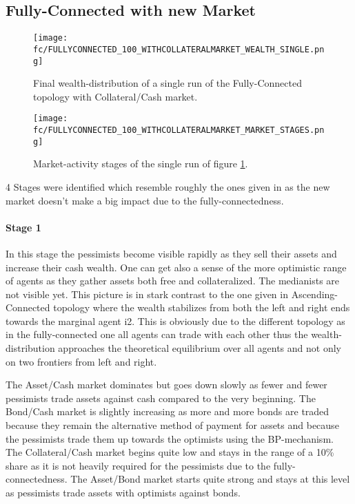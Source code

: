 \documentclass[Bachelorarbeit.tex]{subfiles}
\begin{document}
\subsection{Fully-Connected with new Market}

\begin{figure}[H]
	\centering
  \texttt{[image: fc/FULLYCONNECTED\_100\_WITHCOLLATERALMARKET\_WEALTH\_SINGLE.png]}
  	\caption{Final wealth-distribution of a single run of the Fully-Connected topology with Collateral/Cash market.}
	\label{fig:wealth_FULLYCONNECTED_100_WITHCOLLATERALMARKET_WEALTH_SINGLE}
\end{figure}

\begin{figure}[H]
	\centering
  \texttt{[image: fc/FULLYCONNECTED\_100\_WITHCOLLATERALMARKET\_MARKET\_STAGES.png]}
  	\caption{Market-activity stages of the single run of figure \ref{fig:wealth_FULLYCONNECTED_100_WITHCOLLATERALMARKET_WEALTH_SINGLE}.}
	\label{fig:markets_FULLYCONNECTED_100_WITHCOLLATERALMARKET_MARKET_STAGES}
\end{figure}

4 Stages were identified which resemble roughly the ones given in \cite{Breuer2015} as the new market doesn't make a big impact due to the fully-connectedness.


\paragraph{Stage 1}
In this stage the pessimists become visible rapidly as they sell their assets and increase their cash wealth. One can get also a sense of the more optimistic range of agents as they gather assets both free and collateralized. The medianists are not visible yet. This picture is in stark contrast to the one given in Ascending-Connected topology where the wealth stabilizes from both the left and right ends towards the marginal agent i2. This is obviously due to the different topology as in the fully-connected one all agents can trade with each other thus the wealth-distribution approaches the theoretical equilibrium over all agents and not only on two frontiers from left and right.

\medskip

The Asset/Cash market dominates but goes down slowly as fewer and fewer pessimists trade assets against cash compared to the very beginning. The Bond/Cash market is slightly increasing as more and more bonds are traded because they remain the alternative method of payment for assets and because the pessimists trade them up towards the optimists using the BP-mechanism. The Collateral/Cash market begins quite low and stays in the range of a 10\% share as it is not heavily required for the pessimists due to the fully-connectedness. The Asset/Bond market starts quite strong and stays at this level as pessimists trade assets with optimists against bonds.
\end{document}
